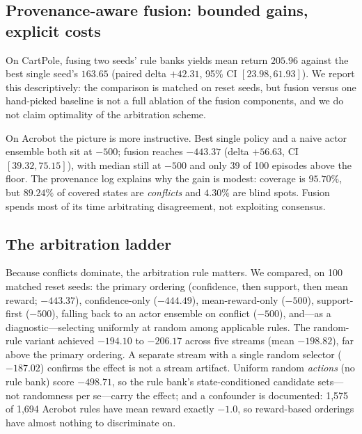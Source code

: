 \documentclass[11pt]{article}
\begin{document}
\subsection{Provenance-aware fusion: bounded gains, explicit costs}
\label{sec:fusion-results}

On CartPole, fusing two seeds' rule banks yields mean return $205.96$ against the best single seed's $163.65$ (paired delta $+42.31$, 95\% CI $[23.98, 61.93]$). We report this descriptively: the comparison is matched on reset seeds, but fusion versus one hand-picked baseline is not a full ablation of the fusion components, and we do not claim optimality of the arbitration scheme.

On Acrobot the picture is more instructive. Best single policy and a naive actor ensemble both sit at $-500$; fusion reaches $-443.37$ (delta $+56.63$, CI $[39.32, 75.15]$), with median still at $-500$ and only 39 of 100 episodes above the floor. The provenance log explains why the gain is modest: coverage is $95.70\%$, but $89.24\%$ of covered states are \textit{conflicts} and $4.30\%$ are blind spots. Fusion spends most of its time arbitrating disagreement, not exploiting consensus.

\subsection{The arbitration ladder}
\label{sec:arbitration}

Because conflicts dominate, the arbitration rule matters. We compared, on 100 matched reset seeds: the primary ordering (confidence, then support, then mean reward; $-443.37$), confidence-only ($-444.49$), mean-reward-only ($-500$), support-first ($-500$), falling back to an actor ensemble on conflict ($-500$), and---as a diagnostic---selecting uniformly at random among applicable rules. The random-rule variant achieved $-194.10$ to $-206.17$ across five streams (mean $-198.82$), far above the primary ordering. A separate stream with a single random selector ($-187.02$) confirms the effect is not a stream artifact. Uniform random \textit{actions} (no rule bank) score $-498.71$, so the rule bank's state-conditioned candidate sets---not randomness per se---carry the effect; and a confounder is documented: 1,575 of 1,694 Acrobot rules have mean reward exactly $-1.0$, so reward-based orderings have almost nothing to discriminate on.
\end{document}
